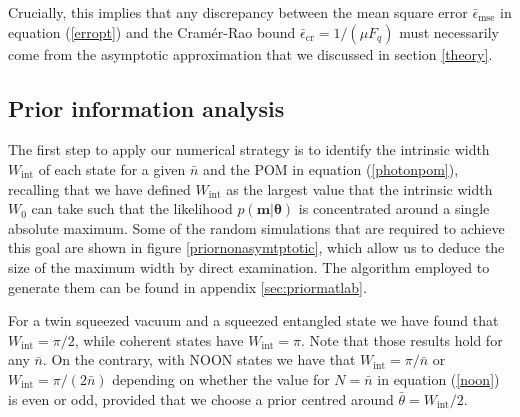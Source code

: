 Crucially, this implies that any discrepancy between the mean square error $\bar{\epsilon}_{\mathrm{mse}}$ in equation (\ref{erropt}) and the Cram\'{e}r-Rao bound $\bar{\epsilon}_{\mathrm{cr}} = 1/(\mu F_q)$ must necessarily come from the asymptotic approximation that we discussed in section \ref{theory}.  

\subsection{Prior information analysis}
\label{subsec:prioranalysis}

The first step to apply our numerical strategy is to identify the intrinsic width $W_{\mathrm{int}}$ of each state for a given $\bar{n}$ and the POM in equation (\ref{photonpom}), recalling that we have defined $W_{\mathrm{int}}$ as the largest value that the intrinsic width $W_0$ can take such that the likelihood $p(\boldsymbol{m}|\boldsymbol{\theta})$ is concentrated around a single absolute maximum. Some of the random simulations that are required to achieve this goal are shown in figure \ref{priornonasymtptotic}, which allow us to deduce the size of the maximum width by direct examination. The algorithm employed to generate them can be found in appendix \ref{sec:priormatlab}.

For a twin squeezed vacuum and a squeezed entangled state we have found that $W_{\mathrm{int}} = \pi/2$, while coherent states have $W_{\mathrm{int}} = \pi$. Note that those results hold for any $\bar{n}$. On the contrary, with NOON states we have that $W_{\mathrm{int}} = \pi/\bar{n}$ or $W_{\mathrm{int}} = \pi/(2\bar{n})$ depending on whether the value for $N = \bar{n}$ in equation (\ref{noon}) is even or odd, provided that we choose a prior centred around $\bar{\theta} = W_{\mathrm{int}}/2$. 

